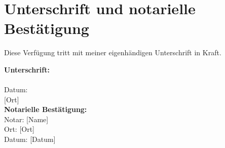 \documentclass[a4paper,12pt]{article}
\begin{document}
\section{Unterschrift und notarielle Bestätigung}
\noindent Diese Verfügung tritt mit meiner eigenhändigen Unterschrift in Kraft.

\vspace{1.5cm}
\noindent \textbf{Unterschrift:} \\
\vspace{2cm}
 \\
\noindent Datum: \underline{\hspace{3cm}} \\
\textnormal{[Ort]} \\

\vspace{2cm}
\noindent \textbf{Notarielle Bestätigung:} \\
\vspace{2cm}
\noindent Notar: [Name] \\
\noindent Ort: [Ort] \\
\noindent Datum: [Datum] \\
\end{document}
